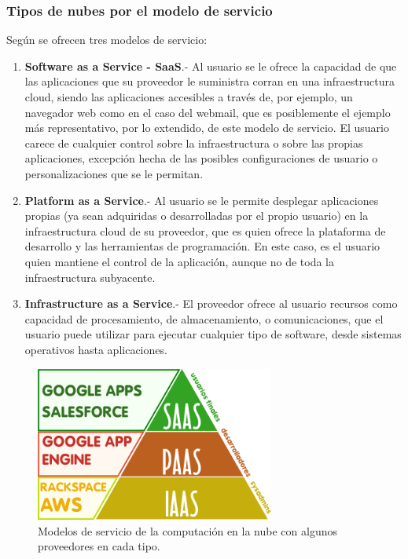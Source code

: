 \subsubsection{Tipos de nubes por el modelo de servicio}
Según \cite{nist} se ofrecen tres modelos de servicio:
\begin{enumerate}
    \item \textbf{Software as a Service - SaaS}.- Al usuario se le ofrece la
          capacidad de que las aplicaciones  que  su  proveedor  le  suministra
          corran  en  una  infraestructura cloud, siendo las aplicaciones accesibles
          a través de, por ejemplo, un navegador web como en el caso del webmail,
          que es posiblemente el ejemplo más representativo, por lo extendido,
          de este modelo de servicio. El usuario carece de cualquier control sobre
          la infraestructura o sobre las propias aplicaciones, excepción hecha
          de las posibles configuraciones de usuario o personalizaciones que se
          le permitan.
    \item \textbf{Platform as a Service}.- Al usuario se le permite desplegar
          aplicaciones propias  (ya  sean  adquiridas  o  desarrolladas  por  el
          propio  usuario)  en  la  infraestructura cloud de  su  proveedor, que
          es  quien  ofrece  la  plataforma  de desarrollo y las herramientas de
          programación. En este caso, es el usuario quien mantiene el control de
          la aplicación, aunque no de toda la infraestructura subyacente.
    \item \textbf{Infrastructure as a Service}.- El proveedor ofrece al usuario
          recursos como capacidad  de  procesamiento,  de  almacenamiento,  o
          comunicaciones, que el usuario puede utilizar para ejecutar cualquier
          tipo de software, desde sistemas operativos hasta aplicaciones.
\end{enumerate}

\begin{figure}[h]
    \centering
    \captionsetup{justification=centering}
    \includegraphics[width=0.7\textwidth]{Imagenes/Bitmap/cloud1}
    \caption{Modelos de servicio de la computación en la nube con algunos proveedores en cada tipo.}
    \label{fig:cloud1}
\end{figure}

